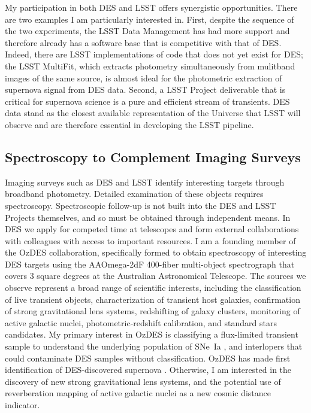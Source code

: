 \documentclass{article}
\begin{document}
My participation in both DES and LSST offers synergistic opportunities.  There are two examples I am particularly interested
in.  First, despite the sequence of the two experiments, the LSST Data Management has had more support and therefore
already has a software base that is competitive with that of DES.  Indeed, there are LSST implementations of
code that does not yet exist for DES; the LSST MultiFit, which extracts photometry simultaneously from mulitband images
of the same source, is almost ideal for the photometric extraction of supernova signal from DES data.
Second, a LSST Project deliverable that is critical for supernova science is a pure and efficient stream of transients.
DES data stand as the closest available representation of the Universe that LSST will observe and are therefore
essential in developing the LSST pipeline.

\subsection{Spectroscopy to Complement Imaging Surveys}
Imaging surveys such as DES and LSST identify interesting targets through broadband photometry.
Detailed examination of these objects requires spectroscopy. Spectroscopic follow-up is not
built into the DES and LSST Projects themselves, and so must be obtained through independent means.
In DES we apply for competed time at
telescopes and form external collaborations with colleagues with access to important resources.  I am a founding member of the OzDES collaboration, specifically formed to obtain spectroscopy
of interesting DES targets using the AAOmega-2dF 400-fiber multi-object spectrograph that covers
3 square degrees at the Australian Astronomical Telescope.
The sources we observe represent a broad range of scientific interests,
including the classification of live transient objects, characterization of transient host galaxies, confirmation
of strong gravitational lens systems, redshifting of galaxy clusters, monitoring of active galactic nuclei, photometric-redshift
calibration,
and
standard stars candidates.  My primary interest in OzDES is classifying a flux-limited transient sample to understand the
underlying population of SNe~Ia  \cite{2006MNRAS.370..933J}, and interlopers that could contaminate DES samples
without classification.  OzDES has made first identification of DES-discovered supernova \cite{2013ATel.5568....1C}.
Otherwise, I am interested in the discovery of new strong gravitational lens systems, and the potential use
of reverberation mapping of active galactic nuclei as a new cosmic distance indicator.
\end{document}
